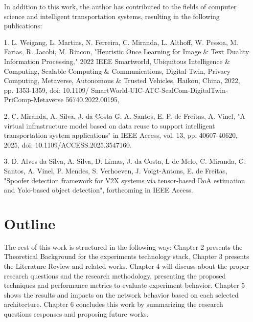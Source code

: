 In addition to this work, the author has contributed to the fields of computer science and intelligent transportation systems, resulting in the following publications:

\begin{citacao}[english]
1. L. Weigang, L. Martins, N. Ferreira, C. Miranda, L. Althoff, W. Pessoa, M. Farias, R. Jacobi, M. Rincon, "Heuristic Once Learning for Image \& Text Duality Information Processing," 2022 IEEE Smartworld, Ubiquitous Intelligence \& Computing, Scalable Computing \& Communications, Digital Twin, Privacy Computing, Metaverse, Autonomous \& Trusted Vehicles, Haikou, China, 2022, pp. 1353-1359, doi:  10.1109/ SmartWorld-UIC-ATC-ScalCom-DigitalTwin-PriComp-Metaverse 56740.2022.00195,
\end{citacao}

\begin{citacao}[english]
2. C. Miranda, A. Silva, J. da Costa G. A. Santos, E. P. de Freitas, A. Vinel, "A virtual infrastructure model based on data reuse to support intelligent transportation system applications" in IEEE Access, vol. 13, pp. 40607-40620, 2025, doi: 10.1109/ACCESS.2025.3547160.
\end{citacao}

\begin{citacao}[english]
3. D. Alves da Silva, A. Silva, D. Limas, J. da Costa, L de Melo, C. Miranda,
G. Santos, A. Vinel, P. Mendes, S. Verhoeven, J. Voigt-Antons, E. de Freitas, "Spoofer detection framework for V2X systems via tensor-based DoA estimation and Yolo-based object detection", forthcoming in IEEE Access.
\end{citacao}

\section{Outline}

The rest of this work is structured in the following way: Chapter 2 presents the Theoretical Background for the experiments technology stack, Chapter 3 presents the Literature Review and related works. Chapter 4 will discuss about the proper research questions and the research methodology, presenting the proposed techniques and performance metrics to evaluate experiment behavior. Chapter 5 shows the results and impacts on the network behavior based on each selected architecture. Chapter 6 concludes this work by summarizing the research questions responses and proposing future works.

